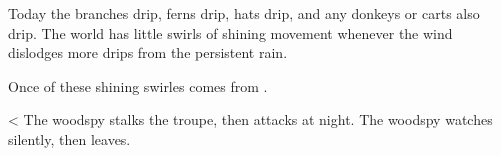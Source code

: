 \begin{boxtext}
  Today the branches drip, ferns drip, hats drip, and any donkeys or carts also drip.
  The world has little swirls of shining movement whenever the wind dislodges more drips from the persistent rain.
\end{boxtext}

Once of these shining swirles comes from .

\woodspy

\randomize
\ifnum\thehp<\value{r12}
  The \gls{woodspy} stalks the troupe, then attacks at night.
\else
  The \gls{woodspy} watches silently, then leaves.
\fi

